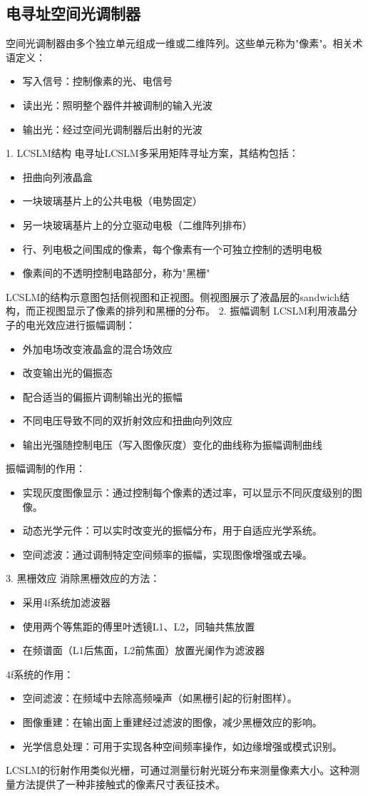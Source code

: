 \documentclass[11pt,a4paper]{article}
\begin{document}
\subsection{电寻址空间光调制器}
空间光调制器由多个独立单元组成一维或二维阵列。这些单元称为"像素"。相关术语定义：
\begin{itemize}
\item 写入信号：控制像素的光、电信号
\item 读出光：照明整个器件并被调制的输入光波
\item 输出光：经过空间光调制器后出射的光波
\end{itemize}
1. LCSLM结构
电寻址LCSLM多采用矩阵寻址方案，其结构包括：
\begin{itemize}
\item 扭曲向列液晶盒
\item 一块玻璃基片上的公共电极（电势固定）
\item 另一块玻璃基片上的分立驱动电极（二维阵列排布）
\item 行、列电极之间围成的像素，每个像素有一个可独立控制的透明电极
\item 像素间的不透明控制电路部分，称为"黑栅"
\end{itemize}
LCSLM的结构示意图包括侧视图和正视图。侧视图展示了液晶层的sandwich结构，而正视图显示了像素的排列和黑栅的分布。
2. 振幅调制
LCSLM利用液晶分子的电光效应进行振幅调制：
\begin{itemize}
\item 外加电场改变液晶盒的混合场效应
\item 改变输出光的偏振态
\item 配合适当的偏振片调制输出光的振幅
\item 不同电压导致不同的双折射效应和扭曲向列效应
\item 输出光强随控制电压（写入图像灰度）变化的曲线称为振幅调制曲线
\end{itemize}
振幅调制的作用：
\begin{itemize}
    \item 实现灰度图像显示：通过控制每个像素的透过率，可以显示不同灰度级别的图像。
    \item 动态光学元件：可以实时改变光的振幅分布，用于自适应光学系统。
    \item 空间滤波：通过调制特定空间频率的振幅，实现图像增强或去噪。
\end{itemize}
3. 黑栅效应
消除黑栅效应的方法：
\begin{itemize}
\item 采用4f系统加滤波器
\item 使用两个等焦距的傅里叶透镜L1、L2，同轴共焦放置
\item 在频谱面（L1后焦面，L2前焦面）放置光阑作为滤波器
\end{itemize}
4f系统的作用：
\begin{itemize}
    \item 空间滤波：在频域中去除高频噪声（如黑栅引起的衍射图样）。
    \item 图像重建：在输出面上重建经过滤波的图像，减少黑栅效应的影响。
    \item 光学信息处理：可用于实现各种空间频率操作，如边缘增强或模式识别。
\end{itemize}
LCSLM的衍射作用类似光栅，可通过测量衍射光斑分布来测量像素大小。这种测量方法提供了一种非接触式的像素尺寸表征技术。
\end{document}
